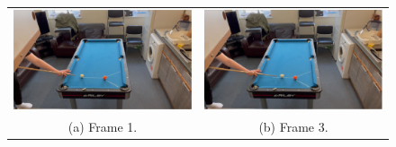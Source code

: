 \documentclass[ %
                author={Finn Alexander Wilkinson},
                supervisor={Dr. Andrew Calway},
                degree={MEng},
                title={\centering A Mixed Reality Aim Assistant for Pool and Snooker},
                subtitle={},
                type={Enterprise},
                year={2021} ]{dissertation}
\begin{document}
\begin{figure}[h!]
    \centering
    \begin{tabular}{cc}
         \includegraphics[scale = 0.15]{Images/Eval/Path Estimate/Cut Back/Frame 1.PNG} & \includegraphics[scale = 0.15]{Images/Eval/Path Estimate/Cut Back/Frame 3.PNG} \\
         (a) Frame 1. & (b) Frame 3. \\ [6pt]

\end{tabular}
\end{figure}
\end{document}
